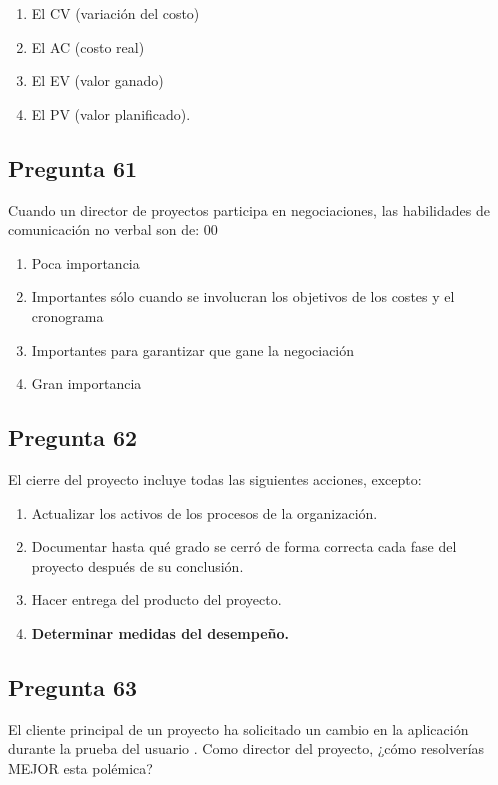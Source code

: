 \documentclass[11pt,a4paper]{article}
\begin{document}
\begin{enumerate}[label=\alph*)]
  \item El CV (variación del costo)
  \item El AC (costo real)
  \item El EV (valor ganado)
  \item El PV (valor planificado).
\end{enumerate}

\subsection*{Pregunta 61}
Cuando un director de proyectos participa en negociaciones, las habilidades de comunicación no verbal son de: 00

\begin{enumerate}[label=\alph*)]
  \item Poca importancia
  \item Importantes sólo cuando se involucran los objetivos de los costes y el cronograma
  \item Importantes para garantizar que gane la negociación
  \item Gran importancia
\end{enumerate}

\subsection*{Pregunta 62}
El cierre del proyecto incluye todas las siguientes acciones, excepto:

\begin{enumerate}[label=\alph*)]
  \item Actualizar los activos de los procesos de la organización.
  \item Documentar hasta qué grado se cerró de forma correcta cada fase del proyecto después de su conclusión.
  \item Hacer entrega del producto del proyecto.
  \item \textbf{Determinar medidas del desempeño.}
\end{enumerate}

\subsection*{Pregunta 63}
El cliente principal de un proyecto ha solicitado un cambio en la aplicación durante la prueba del usuario . Como director del proyecto, ¿cómo resolverías MEJOR esta polémica?
\end{document}
